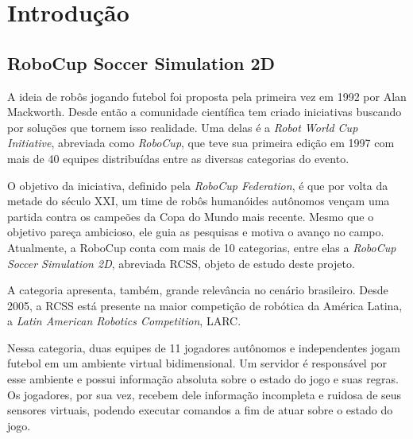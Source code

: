 
\chapter{Introdução}

\label{CapIntro}



\section{RoboCup Soccer Simulation 2D}
\par A ideia de robôs jogando futebol foi proposta pela primeira vez em 1992 por Alan Mackworth\cite{mackworth1993seeing}.
Desde então a comunidade científica tem criado iniciativas buscando por soluções que tornem isso realidade.
Uma delas é a \textit{Robot World Cup Initiative}, abreviada como \textit{RoboCup}, que teve sua primeira edição em 1997 com mais de 40 equipes distribuídas entre as diversas categorias do evento.
\par O objetivo da iniciativa, definido pela \textit{RoboCup Federation}, é que por volta da metade do século XXI, um time de robôs humanóides autônomos vençam uma partida contra os campeões da Copa do Mundo mais recente. Mesmo que o objetivo pareça ambicioso, ele guia as pesquisas e motiva o avanço no campo.
Atualmente, a RoboCup conta com mais de 10 categorias, entre elas a \textit{RoboCup Soccer Simulation 2D}, abreviada RCSS, objeto de estudo deste projeto.
\par A categoria apresenta, também, grande relevância no cenário brasileiro.
Desde 2005, a RCSS está presente na maior competição de robótica da América Latina, a \textit{Latin American Robotics Competition}, LARC.
\par Nessa categoria, duas equipes de 11 jogadores autônomos e independentes jogam futebol em um ambiente virtual bidimensional.
Um servidor é responsável por esse ambiente e possui informação absoluta sobre o estado do jogo e suas regras.
Os jogadores, por sua vez, recebem dele informação incompleta e ruidosa de seus sensores virtuais, podendo executar comandos a fim de atuar sobre o estado do jogo.

